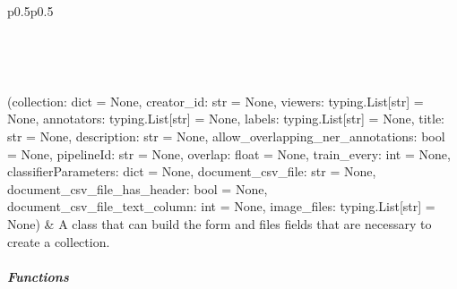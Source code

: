 \documentclass[letterpaper,10pt,english]{sphinxmanual}
\begin{document}
\begin{savenotes}\sphinxatlongtablestart\begin{longtable}[c]{p{0.5\linewidth}p{0.5\linewidth}}
\hline

\endfirsthead

%
{}\\
\hline

\endhead

\hline
{}\\
\endfoot

\endlastfoot

{\hyperref[\detokenize{autoapi/pine/client/models/index:pine.client.models.CollectionBuilder}]{}}(collection: dict = None, creator\_id: str = None, viewers: typing.List{[}str{]} = None, annotators: typing.List{[}str{]} = None, labels: typing.List{[}str{]} = None, title: str = None, description: str = None, allow\_overlapping\_ner\_annotations: bool = None, pipelineId: str = None, overlap: float = None, train\_every: int = None, classifierParameters: dict = None, document\_csv\_file: str = None, document\_csv\_file\_has\_header: bool = None, document\_csv\_file\_text\_column: int = None, image\_files: typing.List{[}str{]} = None)
&
A class that can build the form and files fields that are necessary to create a collection.
\\
\hline
\end{longtable}\sphinxatlongtableend\end{savenotes}


\subparagraph{Functions}
\label{\detokenize{autoapi/pine/client/models/index:functions}}
\end{document}
